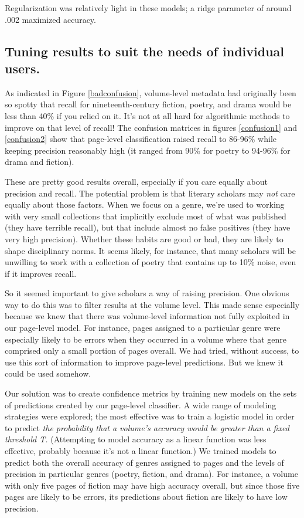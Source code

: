 \documentclass[paper=a4, fontsize=12pt]{scrartcl}
\numberwithin{equation}{section}		%
\numberwithin{figure}{section}			%
\numberwithin{table}{section}				%
\begin{document}
Regularization was relatively light in these models; a ridge parameter of around .002 maximized accuracy.

\subsection{Tuning results to suit the needs of individual users.}
\label{sec:eval}

As indicated in Figure \ref{badconfusion}, volume-level metadata had originally been so spotty that recall for nineteenth-century fiction, poetry, and drama would be less than 40\% if you relied on it. It's not at all hard for algorithmic methods to improve on that level of recall! The confusion matrices in figures \ref{confusion1} and \ref{confusion2} show that page-level classification raised recall to 86-96\% while keeping precision reasonably high (it ranged from 90\% for poetry to 94-96\% for drama and fiction).

These are pretty good results overall, especially if you care equally about precision and recall. The potential problem is that literary scholars may \textit{not} care equally about those factors. When we focus on a genre, we're used to working with very small collections that implicitly exclude most of what was published (they have terrible recall), but that include almost no false positives (they have very high precision). Whether these habits are good or bad, they are likely to shape disciplinary norms. It seems likely, for instance, that many scholars will be unwilling to work with a collection of poetry that contains up to 10\% noise, even if it improves recall.

So it seemed important to give scholars a way of raising precision. One obvious way to do this was to filter results at the volume level. This made sense especially because we knew that there was volume-level information not fully exploited in our page-level model. For instance, pages assigned to a particular genre were especially likely to be errors when they occurred in a volume where that genre comprised only a small portion of pages overall. We had tried, without success, to use this sort of information to improve page-level predictions. But we knew it could be used somehow.

Our solution was to create confidence metrics by training new models on the sets of predictions created by our page-level classifier. A wide range of modeling strategies were explored; the most effective was to train a logistic model in order to predict \textit{the probability that a volume's accuracy would be greater than a fixed threshold T.} (Attempting to model accuracy as a linear function was less effective, probably because it's not a linear function.) We trained models to predict both the overall accuracy of genres assigned to pages and the levels of precision in particular genres (poetry, fiction, and drama). For instance, a volume with only five pages of fiction may have high accuracy overall, but since those five pages are likely to be errors, its predictions about fiction are likely to have low precision.
\end{document}
